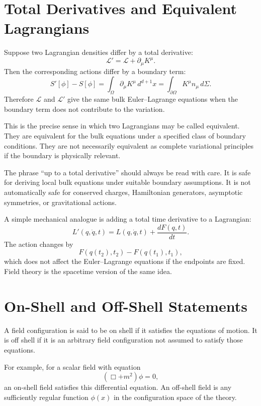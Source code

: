 \section{Total Derivatives and Equivalent Lagrangians}

Suppose two Lagrangian densities differ by a total derivative:
\[
    \mathcal{L}'=\mathcal{L}+\partial_\mu K^\mu.
\]
Then the corresponding actions differ by a boundary term:
\[
    S'[\phi]-S[\phi]
    =\int_\Omega\partial_\mu K^\mu\,d^{d+1}x
    =\int_{\partial\Omega}K^\mu n_\mu\,d\Sigma.
\]
Therefore \(\mathcal{L}\) and \(\mathcal{L}'\) give the same bulk
Euler--Lagrange equations when the boundary term does not contribute to the
variation.

This is the precise sense in which two Lagrangians may be called equivalent.
They are equivalent for the bulk equations under a specified class of boundary
conditions. They are not necessarily equivalent as complete variational
principles if the boundary is physically relevant.

\begin{remarkbox}
The phrase ``up to a total derivative'' should always be read with care. It is
safe for deriving local bulk equations under suitable boundary assumptions. It
is not automatically safe for conserved charges, Hamiltonian generators,
asymptotic symmetries, or gravitational actions.
\end{remarkbox}

A simple mechanical analogue is adding a total time derivative to a Lagrangian:
\[
    L'(q,\dot q,t)=L(q,\dot q,t)+\frac{dF(q,t)}{dt}.
\]
The action changes by
\[
    F(q(t_2),t_2)-F(q(t_1),t_1),
\]
which does not affect the Euler--Lagrange equations if the endpoints are fixed.
Field theory is the spacetime version of the same idea.

\section{On-Shell and Off-Shell Statements}

A field configuration is said to be on shell if it satisfies the equations of
motion. It is off shell if it is an arbitrary field configuration not assumed to
satisfy those equations.

For example, for a scalar field with equation
\[
    (\Box+m^2)\phi=0,
\]
an on-shell field satisfies this differential equation. An off-shell field is
any sufficiently regular function \(\phi(x)\) in the configuration space of the
theory.

